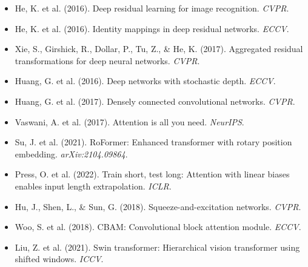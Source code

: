 \begin{itemize}
    \item He, K. et al. (2016). Deep residual learning for image recognition. \textit{CVPR}.
    \item He, K. et al. (2016). Identity mappings in deep residual networks. \textit{ECCV}.
    \item Xie, S., Girshick, R., Dollar, P., Tu, Z., \& He, K. (2017). Aggregated residual transformations for deep neural networks. \textit{CVPR}.
    \item Huang, G. et al. (2016). Deep networks with stochastic depth. \textit{ECCV}.
    \item Huang, G. et al. (2017). Densely connected convolutional networks. \textit{CVPR}.
    \item Vaswani, A. et al. (2017). Attention is all you need. \textit{NeurIPS}.
    \item Su, J. et al. (2021). RoFormer: Enhanced transformer with rotary position embedding. \textit{arXiv:2104.09864}.
    \item Press, O. et al. (2022). Train short, test long: Attention with linear biases enables input length extrapolation. \textit{ICLR}.
    \item Hu, J., Shen, L., \& Sun, G. (2018). Squeeze-and-excitation networks. \textit{CVPR}.
    \item Woo, S. et al. (2018). CBAM: Convolutional block attention module. \textit{ECCV}.
    \item Liu, Z. et al. (2021). Swin transformer: Hierarchical vision transformer using shifted windows. \textit{ICCV}.
\end{itemize}
